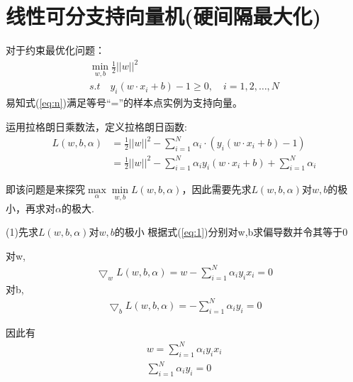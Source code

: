 \documentclass{article}
\begin{document}
\renewcommand\maketitle{}
\section{线性可分支持向量机(硬间隔最大化)}
对于约束最优化问题：
\begin{gather}   \label{eq:m}
    \min\limits_{w,b} \frac{1}{2}||w||^2\\
    s.t\quad y_i(w\cdot x_i+b)-1 \ge 0,\quad i=1,2,\dots,N  \label{eq:n}
\end{gather}
易知式(\ref{eq:n})满足等号“=”的样本点实例为{\color{red}支持向量}。

运用拉格朗日乘数法，定义拉格朗日函数:
\begin{align}
    L(w,b,\alpha)&=\frac{1}{2}||w||^2-\sum_{i=1}^{N}\alpha_i\cdot(y_i (w\cdot x_i+b)-1)\\
    &=\frac{1}{2}||w||^2-\sum_{i=1}^{N}\alpha_i y_i (w\cdot x_i+b)+\sum_{i=1}^{N}\alpha_i  \label{eq:1}
\end{align}

即该问题是来探究$\max\limits_{\alpha}\min\limits_{w,b}L(w,b,\alpha)$，因此需要先求$L(w,b,\alpha)$对$w,b$的极小，再求对$\alpha$的极大.

(1)先求$L(w,b,\alpha)$对$w,b$的极小
 根据式(\ref{eq:1})分别对w,b求偏导数并令其等于0

对w,
\begin{gather}
    \bigtriangledown_w L(w,b,\alpha)=w-\sum_{i=1}^{N}\alpha_i y_i x_i=0    
\end{gather}
对b,
\begin{gather}
    \bigtriangledown_b L(w,b,\alpha)=-\sum_{i=1}^{N}\alpha_i y_i=0    
\end{gather}

因此有
\begin{gather}
    w=\sum_{i=1}^{N}\alpha_i y_i x_i \label{eq:2} \\
    \sum_{i=1}^{N}\alpha_i y_i=0    \label{eq:3}
\end{gather}
\end{document}
